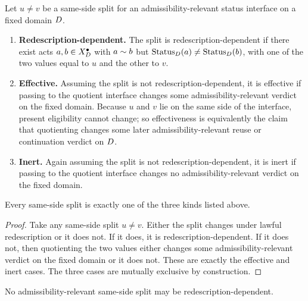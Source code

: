 \begin{definition}
Let $u\neq v$ be a same-side split for an admissibility-relevant status interface on a fixed domain $D$.
\begin{enumerate}[label=(T\arabic*), leftmargin=2.8em]
    \item \textbf{Redescription-dependent.} The split is redescription-dependent if there exist acts $a,b\in X_D^{\bullet}$ with $a\sim b$ but $\mathrm{Status}_D(a)\neq \mathrm{Status}_D(b)$, with one of the two values equal to $u$ and the other to $v$.
    \item \textbf{Effective.} Assuming the split is not redescription-dependent, it is effective if passing to the quotient interface changes some admissibility-relevant verdict on the fixed domain. Because $u$ and $v$ lie on the same side of the interface, present eligibility cannot change; so effectiveness is equivalently the claim that quotienting changes some later admissibility-relevant reuse or continuation verdict on $D$.
    \item \textbf{Inert.} Again assuming the split is not redescription-dependent, it is inert if passing to the quotient interface changes no admissibility-relevant verdict on the fixed domain.
\end{enumerate}
\end{definition}

\begin{lemma}
\label{lem:B-trichotomy}
Every same-side split is exactly one of the three kinds listed above.
\end{lemma}

\begin{proof}
Take any same-side split $u\neq v$. Either the split changes under lawful redescription or it does not. If it does, it is redescription-dependent. If it does not, then quotienting the two values either changes some admissibility-relevant verdict on the fixed domain or it does not. These are exactly the effective and inert cases. The three cases are mutually exclusive by construction.
\end{proof}

\begin{proposition}
\label{prop:B-no-redescription-split}
No admissibility-relevant same-side split may be redescription-dependent.
\end{proposition}

